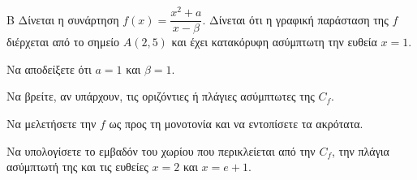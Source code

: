 \begin{thema}{Β}
Δίνεται η συνάρτηση $f(x) = \dfrac{x^2+a}{x-\beta}$. Δίνεται ότι η γραφική παράσταση της $f$ διέρχεται από το σημείο $A(2, 5)$ και έχει κατακόρυφη ασύμπτωτη την ευθεία $x=1$.
\begin{erwthma}
  \item Να αποδείξετε ότι $a=1$ και $\beta=1$.
  \item Να βρείτε, αν υπάρχουν, τις οριζόντιες ή πλάγιες ασύμπτωτες της $C_f$.
  \item Να μελετήσετε την $f$ ως προς τη μονοτονία και να εντοπίσετε τα ακρότατα.
  \item Να υπολογίσετε το εμβαδόν του χωρίου που περικλείεται από την $C_f$, την πλάγια ασύμπτωτή της και τις ευθείες $x=2$ και $x=e+1$.
\end{erwthma}
\end{thema}
